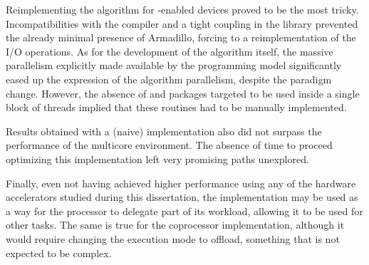 \documentclass[../thesis]{subfiles}
\begin{document}
	Reimplementing the algorithm for \cuda-enabled devices proved to be the most tricky. Incompatibilities with the compiler and a tight coupling in the library prevented the already minimal presence of Armadillo, forcing to a reimplementation of the I/O operations. As for the development of the algorithm itself, the massive parallelism explicitly made available by the \cuda programming model significantly eased up the expression of the algorithm parallelism, despite the paradigm change. However, the absence of \blas and \lapack packages targeted to be used inside a single block of threads implied that these routines had to be manually implemented.

	Results obtained with a (naive) \cuda implementation also did not surpass the performance of the multicore environment. The absence of time to proceed optimizing this implementation left very promising paths unexplored.

	Finally, even not having achieved higher performance using any of the hardware accelerators studied during this dissertation, the \cuda implementation may be used as a way for the processor to delegate part of its workload, allowing it to be used for other tasks. The same is true for the coprocessor implementation, although it would require changing the execution mode to offload, something that is not expected to be complex.
\end{document}
